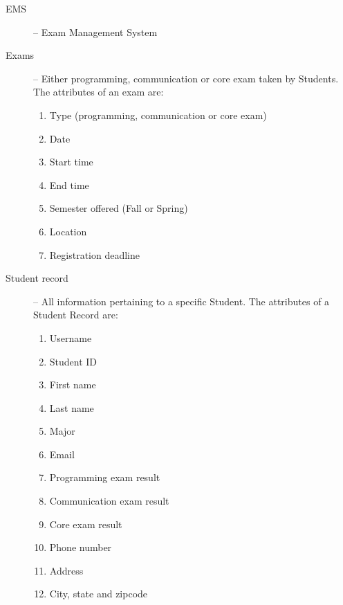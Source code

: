 
\begin{description}
   \item[EMS] -- Exam Management System 
   \item[Exams]\label{def:exam} --  Either programming,
      communication or core exam taken by Students. The attributes of an exam
      are:
      \begin{enumerate}
         \item Type (programming, communication or core exam)
         \item Date
         \item Start time
         \item End time
         \item Semester offered (Fall or Spring)
         \item Location
         \item Registration deadline
      \end{enumerate}
   \item[Student record]\label{def:record} --  All
      information pertaining to a specific Student. The attributes of a Student
      Record are:
      \begin{enumerate}
         \item Username
         \item Student ID
         \item First name
         \item Last name
         \item Major
         \item Email
         \item Programming exam result
         \item Communication exam result
         \item Core exam result
         \item Phone number
         \item Address
         \item City, state and zipcode
      \end{enumerate}
\end{description}

